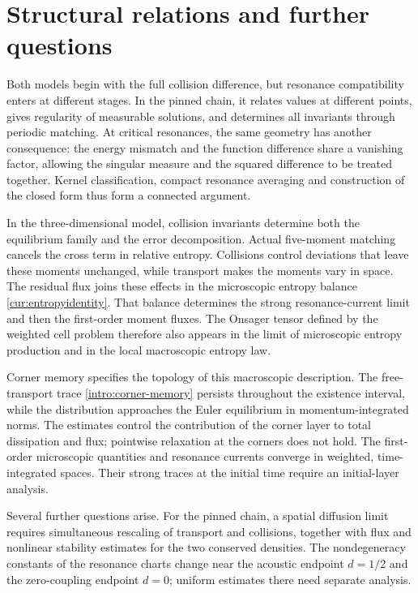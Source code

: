 \section{Structural relations and further questions}\label{intro:discussion}

Both models begin with the full collision difference, but resonance
compatibility enters at different stages. In the pinned chain, it
relates values at different points, gives regularity of measurable
solutions, and determines all invariants through periodic matching.
At critical resonances, the same geometry has another consequence:
the energy mismatch and the function difference share a vanishing
factor, allowing the singular measure and the squared difference to
be treated together. Kernel classification, compact resonance
averaging and construction of the closed form thus form a connected
argument.

In the three-dimensional model, collision invariants determine both
the equilibrium family and the error decomposition. Actual five-moment
matching cancels the cross term in relative entropy. Collisions control
deviations that leave these moments unchanged, while transport makes the
moments vary in space. The residual flux joins these effects in the
microscopic entropy balance \eqref{cur:entropyidentity}. That balance
determines the strong resonance-current limit and then the first-order
moment fluxes. The Onsager tensor defined by the weighted cell problem
therefore also appears in the limit of microscopic entropy production
and in the local macroscopic entropy law.

Corner memory specifies the topology of this macroscopic description.
The free-transport trace \eqref{intro:corner-memory} persists throughout
the existence interval, while the distribution approaches the Euler
equilibrium in momentum-integrated norms. The estimates control the
contribution of the corner layer to total dissipation and flux;
pointwise relaxation at the corners does not hold. The first-order
microscopic quantities and resonance currents converge in weighted,
time-integrated spaces. Their strong traces at the initial time
require an initial-layer analysis.

Several further questions arise. For the pinned chain, a spatial
diffusion limit requires simultaneous rescaling of transport and
collisions, together with flux and nonlinear stability estimates
for the two conserved densities. The nondegeneracy constants of the
resonance charts change near the acoustic endpoint $d=1/2$ and the
zero-coupling endpoint $d=0$; uniform estimates there need separate
analysis.

